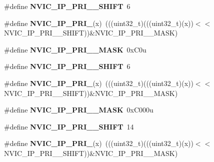 \begin{DoxyCompactItemize}
\#define {\bfseries N\+V\+I\+C\+\_\+\+I\+P\+\_\+\+P\+R\+I\+\_\+\_\+\+S\+H\+I\+FT}~6
\item 
\mbox{\label{group___n_v_i_c___register___masks_gaa331603e6a43db4a42779e85e3525f2e}} 
\#define {\bfseries N\+V\+I\+C\+\_\+\+I\+P\+\_\+\+P\+R\+I\+\_}(x)~(((uint32\+\_\+t)(((uint32\+\_\+t)(x))$<$$<$N\+V\+I\+C\+\_\+\+I\+P\+\_\+\+P\+R\+I\+\_\+\_\+\+S\+H\+I\+FT))\&N\+V\+I\+C\+\_\+\+I\+P\+\_\+\+P\+R\+I\+\_\+\_\+\+M\+A\+SK)
\item 
\mbox{\label{group___n_v_i_c___register___masks_ga909049e7c2fb5096158e358b6705c626}} 
\#define {\bfseries N\+V\+I\+C\+\_\+\+I\+P\+\_\+\+P\+R\+I\+\_\+\_\+\+M\+A\+SK}~0x\+C0u
\item 
\mbox{\label{group___n_v_i_c___register___masks_gaeb17cee4dd52ffd4c4846ea19af863e0}} 
\#define {\bfseries N\+V\+I\+C\+\_\+\+I\+P\+\_\+\+P\+R\+I\+\_\+\_\+\+S\+H\+I\+FT}~6
\item 
\mbox{\label{group___n_v_i_c___register___masks_ga1142c83caaad0b88cd0872c563f9a703}} 
\#define {\bfseries N\+V\+I\+C\+\_\+\+I\+P\+\_\+\+P\+R\+I\+\_}(x)~(((uint32\+\_\+t)(((uint32\+\_\+t)(x))$<$$<$N\+V\+I\+C\+\_\+\+I\+P\+\_\+\+P\+R\+I\+\_\+\_\+\+S\+H\+I\+FT))\&N\+V\+I\+C\+\_\+\+I\+P\+\_\+\+P\+R\+I\+\_\+\_\+\+M\+A\+SK)
\item 
\mbox{\label{group___n_v_i_c___register___masks_ga96377193746acdc9f77fef1aa939d7e8}} 
\#define {\bfseries N\+V\+I\+C\+\_\+\+I\+P\+\_\+\+P\+R\+I\+\_\+\_\+\+M\+A\+SK}~0x\+C000u
\item 
\mbox{\label{group___n_v_i_c___register___masks_ga3f0d1e7120ac37c4a4b926c8d770f3bf}} 
\#define {\bfseries N\+V\+I\+C\+\_\+\+I\+P\+\_\+\+P\+R\+I\+\_\+\_\+\+S\+H\+I\+FT}~14
\item 
\mbox{\label{group___n_v_i_c___register___masks_ga291878c83b67a7100c72831522641ee2}} 
\#define {\bfseries N\+V\+I\+C\+\_\+\+I\+P\+\_\+\+P\+R\+I\+\_}(x)~(((uint32\+\_\+t)(((uint32\+\_\+t)(x))$<$$<$N\+V\+I\+C\+\_\+\+I\+P\+\_\+\+P\+R\+I\+\_\+\_\+\+S\+H\+I\+FT))\&N\+V\+I\+C\+\_\+\+I\+P\+\_\+\+P\+R\+I\+\_\+\_\+\+M\+A\+SK)
$$
\end{DoxyCompactItemize}
